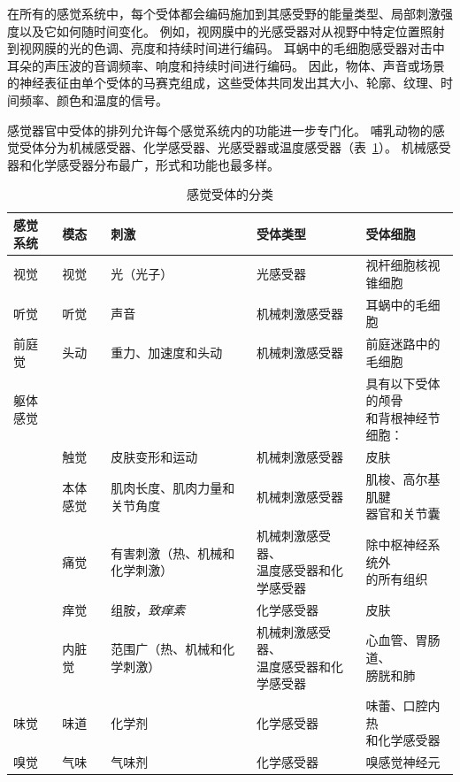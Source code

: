 在所有的感觉系统中，每个受体都会编码施加到其感受野的能量类型、局部刺激强度以及它如何随时间变化。
例如，视网膜中的光感受器对从视野中特定位置照射到视网膜的光的色调、亮度和持续时间进行编码。
耳蜗中的毛细胞感受器对击中耳朵的声压波的音调频率、响度和持续时间进行编码。
因此，物体、声音或场景的神经表征由单个受体的马赛克组成，这些受体共同发出其大小、轮廓、纹理、时间频率、颜色和温度的信号。


感觉器官中受体的排列允许每个感觉系统内的功能进一步专门化。 
哺乳动物的感觉受体分为机械感受器、化学感受器、光感受器或温度感受器（表~\ref{tab:17_1}）。
机械感受器和化学感受器分布最广，形式和功能也最多样。


\begin{table}[htbp]
	\centering
	\caption{感觉受体的分类}
	\begin{tabular}{lllll}
		\toprule
		感觉系统 & 模态 & 刺激 & 受体类型 & 受体细胞 \\
		\midrule
		视觉 & 视觉 & 光（光子）   & 光感受器 & 视杆细胞核视锥细胞\\
		听觉 & 听觉 & 声音   & 机械刺激感受器 & 耳蜗中的毛细胞 \\
		前庭觉 & 头动 & 重力、加速度和头动   & 机械刺激感受器 & 前庭迷路中的毛细胞 \\
		躯体感觉 &  &   &  & \makecell[l]{具有以下受体的颅骨 \\ 和背根神经节细胞：} \\
		 & 触觉 & 皮肤变形和运动   & 机械刺激感受器 & 皮肤 \\
		 & 本体感觉 & 肌肉长度、肌肉力量和关节角度   & 机械刺激感受器 & \makecell[l]{肌梭、高尔基肌腱 \\ 器官和关节囊}  \\
		 & 痛觉 & 有害刺激（热、机械和化学刺激）  & \makecell[l]{机械刺激感受器、 \\ 温度感受器和化学感受器}  & \makecell[l]{除中枢神经系统外 \\ 的所有组织}  \\
		 & 痒觉 & 组胺，\textit{致痒素}  & 化学感受器 & 皮肤 \\
		 & 内脏觉 & 范围广（热、机械和化学刺激）  & \makecell[l]{机械刺激感受器、 \\ 温度感受器和化学感受器} & \makecell[l]{心血管、胃肠道、 \\ 膀胱和肺}  \\
		味觉 & 味道 & 化学剂   & 化学感受器 & \makecell[l]{味蕾、口腔内热 \\ 和化学感受器}  \\
		嗅觉 & 气味 & 气味剂   & 化学感受器 & 嗅感觉神经元 \\
		\bottomrule
	\end{tabular}%
	\label{tab:17_1}%
\end{table}%



